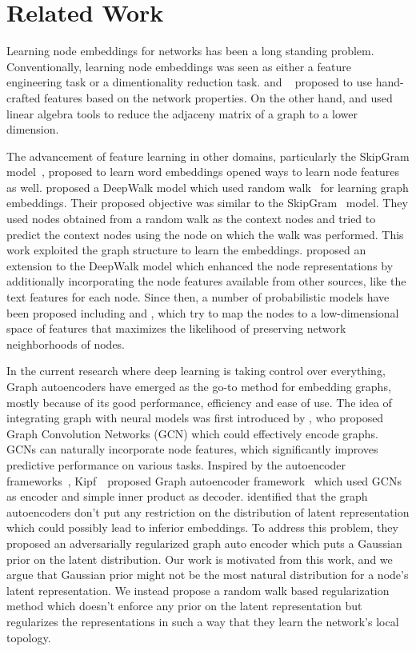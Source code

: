 \documentclass{article}
\newcommand{\etal}{\text{et al.}}
\begin{document}
\section{Related Work}
Learning node embeddings for networks has been a long standing problem. Conventionally, learning node embeddings was seen as either a feature engineering task or a dimentionality reduction task. \cite{tang2011leveraging} and ~\cite{henderson2011s} proposed to use hand-crafted features based on the network properties. On the other hand, \cite{belkin2002laplacian} and \cite{roweis2000nonlinear} used linear algebra tools to reduce the adjaceny matrix of a graph to a lower dimension.

The advancement of feature learning in other domains, particularly the SkipGram model~\cite{mikolov2013distributed}, proposed to learn word embeddings opened ways to learn node features as well. \cite{perozzi2014deepwalk} proposed a DeepWalk model which used random walk~\cite{rwr} for learning graph embeddings. Their proposed objective was similar to the SkipGram~\cite{mikolov2013distributed} model. They used nodes obtained from a random walk as the context nodes and tried to predict the context nodes using the node on which the walk was performed. This work exploited the graph structure to learn the embeddings. \cite{yang2015network} proposed an extension to the DeepWalk model which enhanced the node representations by additionally incorporating the node features available from other sources, like the text features for each node. Since then, a number of probabilistic models have been proposed including \cite{grover2016node2vec} and \cite{tang2015line}, which try to map the nodes to a low-dimensional space of features that maximizes the likelihood of preserving network neighborhoods of nodes.

In the current research where deep learning is taking control over everything, Graph autoencoders have emerged as the go-to method for embedding graphs, mostly because of its good performance, efficiency and ease of use. The idea of integrating graph with neural models was first introduced by \cite{kipf2016semi}, who proposed Graph Convolution Networks (GCN) which could effectively encode graphs. GCNs can naturally incorporate node features, which significantly improves predictive performance on various tasks. Inspired by the autoencoder frameworks~\cite{kingma2013auto}, Kipf~\etal~proposed Graph autoencoder framework~\cite{vgae} which used GCNs as encoder and simple inner product as decoder. \cite{argae} identified that the graph autoencoders don't put any restriction on the distribution of latent representation which could possibly lead to inferior embeddings. To address this problem, they proposed an adversarially regularized graph auto encoder which puts a Gaussian prior on the latent distribution. Our work is motivated from this work, and we argue that Gaussian prior might not be the most natural distribution for a node's latent representation. We instead propose a random walk based regularization method which doesn't enforce any prior on the latent representation but regularizes the representations in such a way that they learn the network's local topology.
\end{document}
